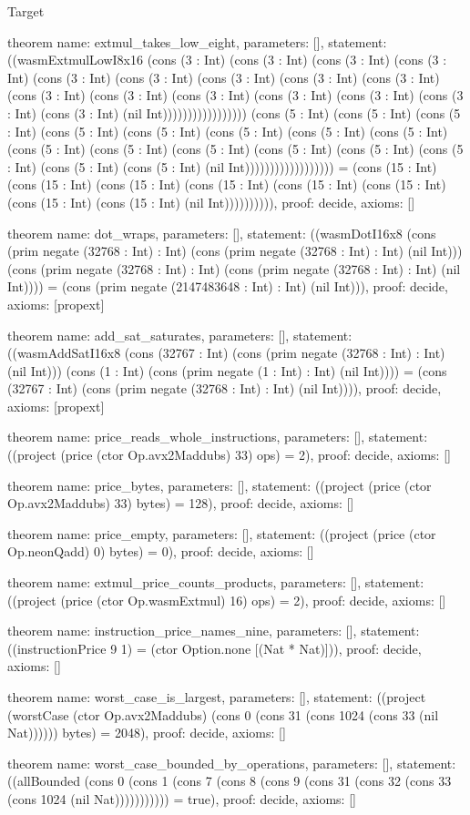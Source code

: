 \begin{lexlean}{Target}
\begin{semanticmodule}
theorem{
  name: extmul_takes_low_eight,
  parameters: [],
  statement: ((wasmExtmulLowI8x16 (cons (3 : Int) (cons (3 : Int) (cons (3 : Int) (cons (3 : Int) (cons (3 : Int) (cons (3 : Int) (cons (3 : Int) (cons (3 : Int) (cons (3 : Int) (cons (3 : Int) (cons (3 : Int) (cons (3 : Int) (cons (3 : Int) (cons (3 : Int) (cons (3 : Int) (cons (3 : Int) (nil Int))))))))))))))))) (cons (5 : Int) (cons (5 : Int) (cons (5 : Int) (cons (5 : Int) (cons (5 : Int) (cons (5 : Int) (cons (5 : Int) (cons (5 : Int) (cons (5 : Int) (cons (5 : Int) (cons (5 : Int) (cons (5 : Int) (cons (5 : Int) (cons (5 : Int) (cons (5 : Int) (cons (5 : Int) (nil Int)))))))))))))))))) = (cons (15 : Int) (cons (15 : Int) (cons (15 : Int) (cons (15 : Int) (cons (15 : Int) (cons (15 : Int) (cons (15 : Int) (cons (15 : Int) (nil Int)))))))))),
  proof: decide{},
  axioms: []
}

theorem{
  name: dot_wraps,
  parameters: [],
  statement: ((wasmDotI16x8 (cons (prim negate (32768 : Int) : Int) (cons (prim negate (32768 : Int) : Int) (nil Int))) (cons (prim negate (32768 : Int) : Int) (cons (prim negate (32768 : Int) : Int) (nil Int)))) = (cons (prim negate (2147483648 : Int) : Int) (nil Int))),
  proof: decide{},
  axioms: [propext]
}

theorem{
  name: add_sat_saturates,
  parameters: [],
  statement: ((wasmAddSatI16x8 (cons (32767 : Int) (cons (prim negate (32768 : Int) : Int) (nil Int))) (cons (1 : Int) (cons (prim negate (1 : Int) : Int) (nil Int)))) = (cons (32767 : Int) (cons (prim negate (32768 : Int) : Int) (nil Int)))),
  proof: decide{},
  axioms: [propext]
}

theorem{
  name: price_reads_whole_instructions,
  parameters: [],
  statement: ((project (price (ctor Op.avx2Maddubs) 33) ops) = 2),
  proof: decide{},
  axioms: []
}

theorem{
  name: price_bytes,
  parameters: [],
  statement: ((project (price (ctor Op.avx2Maddubs) 33) bytes) = 128),
  proof: decide{},
  axioms: []
}

theorem{
  name: price_empty,
  parameters: [],
  statement: ((project (price (ctor Op.neonQadd) 0) bytes) = 0),
  proof: decide{},
  axioms: []
}

theorem{
  name: extmul_price_counts_products,
  parameters: [],
  statement: ((project (price (ctor Op.wasmExtmul) 16) ops) = 2),
  proof: decide{},
  axioms: []
}

theorem{
  name: instruction_price_names_nine,
  parameters: [],
  statement: ((instructionPrice 9 1) = (ctor Option.none [(Nat * Nat)])),
  proof: decide{},
  axioms: []
}

theorem{
  name: worst_case_is_largest,
  parameters: [],
  statement: ((project (worstCase (ctor Op.avx2Maddubs) (cons 0 (cons 31 (cons 1024 (cons 33 (nil Nat)))))) bytes) = 2048),
  proof: decide{},
  axioms: []
}

theorem{
  name: worst_case_bounded_by_operations,
  parameters: [],
  statement: ((allBounded (cons 0 (cons 1 (cons 7 (cons 8 (cons 9 (cons 31 (cons 32 (cons 33 (cons 1024 (nil Nat))))))))))) = true),
  proof: decide{},
  axioms: []
}
\end{semanticmodule}
\end{lexlean}
